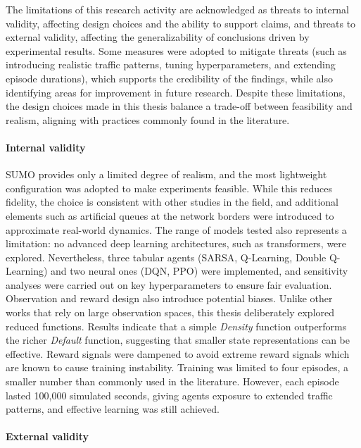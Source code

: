 The limitations of this research activity are acknowledged as threats to internal validity, affecting design choices and the ability to support claims, and threats to external validity, affecting the generalizability of conclusions driven by experimental results.
Some measures were adopted to mitigate threats (such as introducing realistic traffic patterns, tuning hyperparameters, and extending episode durations), which supports the credibility of the findings, while also identifying areas for improvement in future research.
Despite these limitations, the design choices made in this thesis balance a trade-off between feasibility and realism, aligning with practices commonly found in the literature.

\paragraph{Internal validity}

SUMO provides only a limited degree of realism, and the most lightweight configuration was adopted to make experiments feasible.
While this reduces fidelity, the choice is consistent with other studies in the field, and additional elements such as artificial queues at the network borders were introduced to approximate real-world dynamics.
The range of models tested also represents a limitation: no advanced deep learning architectures, such as transformers, were explored.
Nevertheless, three tabular agents (SARSA, Q-Learning, Double Q-Learning) and two neural ones (DQN, PPO) were implemented, and sensitivity analyses were carried out on key hyperparameters to ensure fair evaluation.
Observation and reward design also introduce potential biases.
Unlike other works that rely on large observation spaces, this thesis deliberately explored reduced functions.
Results indicate that a simple \textit{Density} function outperforms the richer \textit{Default} function, suggesting that smaller state representations can be effective.
Reward signals were dampened to avoid extreme reward signals which are known to cause training instability.
Training was limited to four episodes, a smaller number than commonly used in the literature.
However, each episode lasted 100,000 simulated seconds, giving agents exposure to extended traffic patterns, and effective learning was still achieved.

\paragraph{External validity}

